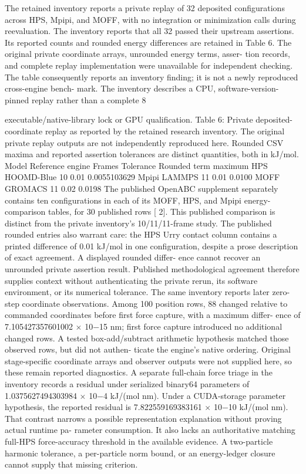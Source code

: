 \documentclass[11pt]{article}
\begin{document}
The retained inventory reports a private replay of 32 deposited configurations across HPS, Mpipi,
and MOFF, with no integration or minimization calls during reevaluation. The inventory reports
that all 32 passed their upstream assertions. Its reported counts and rounded energy differences
are retained in Table 6. The original private coordinate arrays, unrounded energy terms, asser-
tion records, and complete replay implementation were unavailable for independent checking. The
table consequently reports an inventory finding; it is not a newly reproduced cross-engine bench-
mark. The inventory describes a CPU, software-version-pinned replay rather than a complete
8

executable/native-library lock or GPU qualification.
Table 6: Private deposited-coordinate replay as reported by the retained research inventory. The
original private replay outputs are not independently reproduced here. Rounded CSV maxima and
reported assertion tolerances are distinct quantities, both in kJ/mol.
Model Reference engine Frames Tolerance Rounded term maximum
HPS HOOMD-Blue 10 0.01 0.0055103629
Mpipi LAMMPS 11 0.01 0.0100
MOFF GROMACS 11 0.02 0.0198
The published OpenABC supplement separately contains ten configurations in each of its
MOFF, HPS, and Mpipi energy-comparison tables, for 30 published rows [ 2]. This published
comparison is distinct from the private inventory’s 10/11/11-frame study. The published rounded
entries also warrant care: the HPS Urry contact column contains a printed difference of 0.01 kJ/mol
in one configuration, despite a prose description of exact agreement. A displayed rounded differ-
ence cannot recover an unrounded private assertion result. Published methodological agreement
therefore supplies context without authenticating the private rerun, its software environment, or
its numerical tolerance.
The same inventory reports later zero-step coordinate observations. Among 100 position rows,
88 changed relative to commanded coordinates before first force capture, with a maximum differ-
ence of 7.105427357601002 \ensuremath{\times} 10\ensuremath{-}15 nm; first force capture introduced no additional changed rows.
A tested box-add/subtract arithmetic hypothesis matched those observed rows, but did not authen-
ticate the engine’s native ordering. Original stage-specific coordinate arrays and observer outputs
were not supplied here, so these remain reported diagnostics.
A separate full-chain force triage in the inventory records a residual under serialized binary64
parameters of
1.0375627494303984 \ensuremath{\times} 10\ensuremath{-}4 kJ/(mol nm).
Under a CUDA-storage parameter hypothesis, the reported residual is
7.822559169383161 \ensuremath{\times} 10\ensuremath{-}10 kJ/(mol nm).
That contrast narrows a possible representation explanation without proving actual runtime pa-
rameter consumption. It also lacks an authoritative matching full-HPS force-accuracy threshold
in the available evidence. A two-particle harmonic tolerance, a per-particle norm bound, or an
energy-ledger closure cannot supply that missing criterion.
\end{document}
